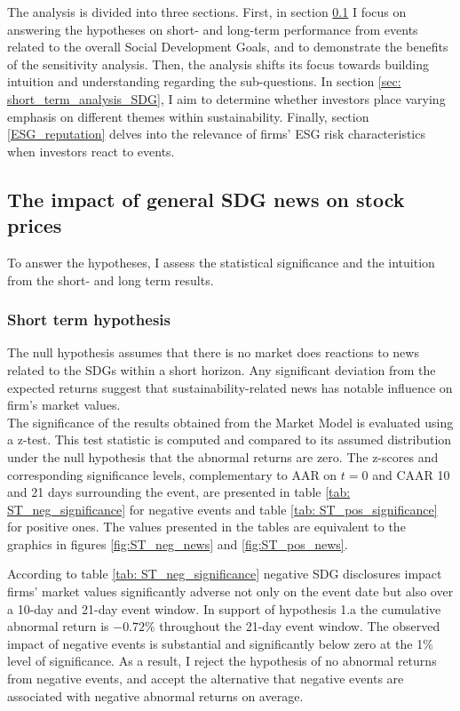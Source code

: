 
The analysis is divided into three sections. First, in section \ref{sec: short_term_analysis} I focus on answering the hypotheses on short- and long-term performance from events related to the overall Social Development Goals, and to demonstrate the benefits of the sensitivity analysis. Then, the analysis shifts its focus towards building intuition and understanding regarding the sub-questions. In section \ref{sec: short_term_analysis_SDG}, I aim to determine whether investors place varying emphasis on different themes within sustainability. Finally, section \ref{ESG_reputation} delves into the relevance of firms' ESG risk characteristics when investors react to events.

\subsection{The impact of general SDG news on stock prices} \label{sec: short_term_analysis}
 
To answer the hypotheses, I assess the statistical significance and the intuition from the short- and long term results.  

\subsubsection{Short term hypothesis} 

The null hypothesis assumes that there is no market does reactions to news related to the SDGs within a short horizon. Any significant deviation from the expected returns suggest that sustainability-related news has notable influence on firm's market values.  \\
The significance of the results obtained from the Market Model is evaluated using a z-test. This test statistic is computed and compared to its assumed distribution under the null hypothesis that the abnormal returns are zero. The z-scores and corresponding significance levels, complementary to AAR on $t=0$ and CAAR 10 and 21 days surrounding the event, are presented in table \ref{tab: ST_neg_significance} for negative events and table \ref{tab: ST_pos_significance} for positive ones. The values presented in the tables are equivalent to the graphics in figures \ref{fig:ST_neg_news} and \ref{fig:ST_pos_news}. 

According to table \ref{tab: ST_neg_significance} negative SDG disclosures impact firms' market values significantly adverse not only on the event date but also over a 10-day and 21-day event window. In support of hypothesis 1.a the cumulative abnormal return is $-0.72\%$ throughout the 21-day event window. The observed impact of negative events is substantial and significantly below zero at the 1\% level of significance. As a result, I reject the hypothesis of no abnormal returns from negative events, and accept the alternative that negative events are associated with negative abnormal returns on average. 

